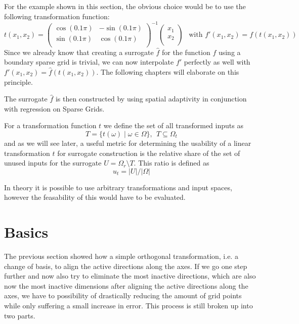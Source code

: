 \documentclass[
  a4paper,  %
  twoside,  %
  bibliography=totoc,
  headsepline,
  cleardoublepage=empty,
  parskip=half,
  draft=false
]{scrbook}
\begin{document}
For the example shown in this section, the obvious choice would be to use the following transformation function:
\begin{equation}
t(x_1,x_2)=\begin{pmatrix}
    \cos(0.1 \pi) & -\sin(0.1 \pi)\\
    \sin(0.1 \pi) & \cos(0.1 \pi)
    \\
  \end{pmatrix}^{-1} \begin{pmatrix}
    x_1 \\ x_2
    \\
  \end{pmatrix} ~~ \text{ with } f'(x_1,x_2)=f(t(x_1,x_2)) 
\end{equation}
Since we already know that creating a surrogate $\hat{f}$ for the function $f$ using a boundary sparse grid is trivial, we can now interpolate $f'$ perfectly as well with $f'(x_1,x_2)=\hat{f}(t(x_1,x_2))$.
The following chapters will elaborate on this principle.


The surrogate $\hat{f}$ is then constructed by using spatial adaptivity in conjunction with regression on Sparse Grids.
\begin{definition}
For a transformation function $t$ we define the set of all transformed inputs as
\begin{equation}
T=\{t(\omega)\mid \omega\in\Omega\}, ~~ T \subseteq \Omega_t
\end{equation}
and as we will see later, a useful metric for determining the usability of a linear transformation $t$ for surrogate construction is the relative share of the set of unused inputs for the surrogate $U=\Omega_r \setminus T$.
This ratio is defined as
\begin{equation}
u_t = |U| / |\Omega|
\end{equation}
\end{definition}

In theory it is possible to use arbitrary transformations and input spaces, however the feasability of this would have to be evaluated.

\section{Basics}

The previous section showed how a simple orthogonal transformation, i.e. a change of basis, to align the active directions along the axes.
If we go one step further and now also try to eliminate the most inactive directions, which are also now the most inactive dimensions after aligning the active directions along the axes, we have to possibility of drastically reducing the amount of grid points while only suffering a small increase in error.
This process is still broken up into two parts.
\end{document}
